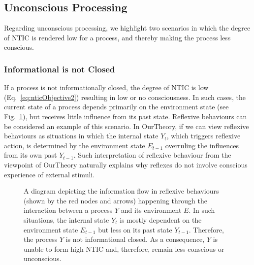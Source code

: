 \documentclass[utf8]{article}
\begin{document}
        \subsection{Unconscious Processing}
            Regarding unconscious processing, we highlight two scenarios in which the degree of NTIC is rendered low for a process, and thereby making the process less conscious.
        
            \subsubsection*{Informational is not Closed}\label{sec:reflexive}
                If a process is not informationally closed, the degree of NTIC is low (Eq.~\ref{eq:nticObjective2}) resulting in low or no consciousness. In such cases, the current state of a process depends primarily on the environment state (see Fig.~\ref{fig:reflexive}), but receives little influence from its past state. Reflexive behaviours \citep{casali2013theoretically} can be considered an example of this scenario. In \ac{OurTheory}, if we can view reflexive behaviours as situations in which the internal state $Y_t$, which triggers reflexive action, is determined by the environment state $E_{t-1}$ overruling the influences from its own past $Y_{t-1}$.  Such interpretation of reflexive behaviour from the viewpoint of \ac{OurTheory} naturally explains why reflexes do not involve conscious experience of external stimuli. 

        		\begin{figure}[H]
        			\caption{
        			    A diagram depicting the information flow in reflexive behaviours (shown by the red nodes and arrows) happening through the interaction between a process $Y$ and its environment $E$. In such situations, the internal state $Y_t$ is mostly dependent on the environment state $E_{t-1}$ but less on its past state $Y_{t-1}$. Therefore, the process $Y$ is not informational closed. As a  consequence, $Y$ is unable to form high NTIC and, therefore, remain less conscious or unconscious. 
        			    }
        			\label{fig:reflexive}
        		\end{figure}  
        		
\end{document}
